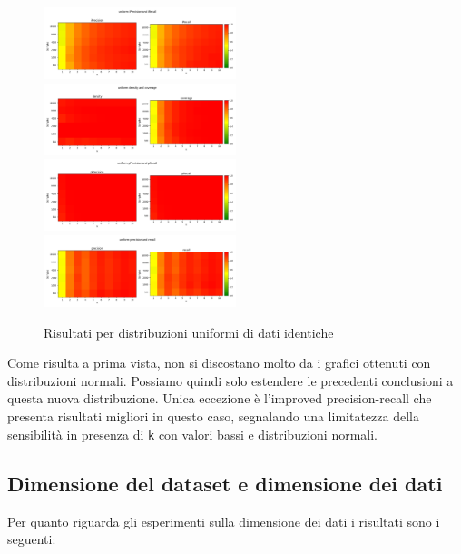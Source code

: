 \begin{figure}[!ht]
    \includegraphics[width=0.5\textwidth]{../images/toyexperiments/kdim/uniform_iPrecision_iRecall.png} 
    \includegraphics[width=0.5\textwidth]{../images/toyexperiments/kdim/uniform_density_coverage.png} 
    \includegraphics[width=0.5\textwidth]{../images/toyexperiments/kdim/uniform_pPrecision_pRecall.png}
    \includegraphics[width=0.5\textwidth]{../images/toyexperiments/kdim/uniform_precision_recall.png}
    \caption{Risultati per distribuzioni uniformi di dati identiche} 
\end{figure}

Come risulta a prima vista, non si discostano molto da i grafici ottenuti con distribuzioni normali. Possiamo quindi solo estendere le precedenti conclusioni a questa nuova distribuzione.
Unica eccezione è l'improved precision-recall che presenta risultati migliori in questo caso, segnalando una limitatezza della sensibilità in presenza di \texttt{k} con valori bassi e distribuzioni normali.

\subsection{Dimensione del dataset e dimensione dei dati}
\label{sec:res-dataset-data-dim}

Per quanto riguarda gli esperimenti sulla dimensione dei dati i risultati sono i seguenti:

